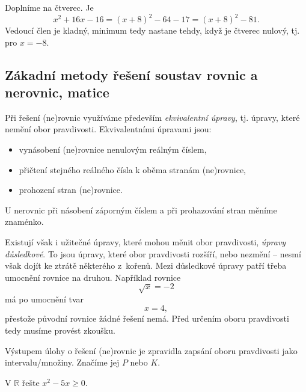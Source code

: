\begin{reseni}
Doplníme na čtverec. Je
$$x^2+16x-16=(x+8)^2-64-17=(x+8)^2-81.$$
Vedoucí člen je kladný, minimum tedy nastane tehdy, když je čtverec nulový, tj. pro $x=-8$.
\end{reseni}


\subsection*{Zákadní metody řešení soustav rovnic a nerovnic, matice}
\par Při řešení (ne)rovnic využíváme především \textit{ekvivalentní úpravy}, tj. úpravy, které
nemění obor pravdivosti. Ekvivalentními úpravami jsou:
\begin{itemize}
	\item vynásobení (ne)rovnice nenulovým reálným číslem,
	\item přičtení stejného reálného čísla k oběma stranám (ne)rovnice,
	\item prohození stran (ne)rovnice.
\end{itemize}

U nerovnic při násobení záporným číslem a při prohazování stran měníme znaménko.

Existují však i užitečné úpravy, které mohou měnit obor pravdivosti, \textit{úpravy důsledkové}.
To jsou úpravy, které obor pravdivosti rozšíří, nebo nezmění -- nesmí však dojít ke ztrátě některého
z~kořenů. Mezi důsledkové úpravy patří třeba umocnění rovnice na druhou. Například rovnice
$$
\sqrt{x} = -2
$$
má po umocnění tvar
$$
    x = 4,
$$
přestože původní rovnice žádné řešení nemá. Před určením oboru pravdivosti tedy musíme provést zkoušku.

\par Výstupem úlohy o řešení (ne)rovnic je zpravidla zapsání oboru pravdivosti jako intervalu/množiny.
Značíme jej $P$ nebo $K$.


\begin{priklad}\label{zaklmet1}
    V $\mathbb R$ řešte $x^2-5x \geq 0.$
\end{priklad}

